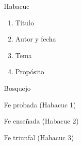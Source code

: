 \documentclass[12pt]{article}
\begin{document}
\begin{section}{Habacuc}
	\begin{enumerate}
		\item Título\\
		\item Autor y fecha\\
		\item Tema\\
		\item Propósito\\
	\end{enumerate}
	\begin{subsection}{Bosquejo}
		\begin{subsubsection}{Fe probada (Habacuc 1)}
		\end{subsubsection}
		\begin{subsubsection}{Fe enseñada (Habacuc 2)}
		\end{subsubsection}
		\begin{subsubsection}{Fe triunfal (Habacuc 3)}
		\end{subsubsection}
	\end{subsection}
\end{section}
\end{document}
